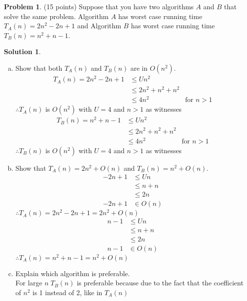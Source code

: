 \documentclass{article}
\theoremstyle{definition}
\newtheorem{problem}{Problem}
\newtheorem*{solution}{Solution}
\begin{document}
\begin{problem} (15 points)
Suppose that you have two algorithms $A$ and $B$ that solve the same
problem. Algorithm $A$ has worst case running time $T_A(n) = 2n^2-2n+1$ 
and Algorithm $B$ has worst case running time $T_B(n) = n^2+n-1$.
\end{problem}
\begin{solution}\ \\
\begin{enumerate}[a)]
\item Show that both $T_A(n)$ and $T_B(n)$ are in $O(n^2)$.
\begin{align*}
  T_A(n) = 2n^2 - 2n + 1 &\le U n^2 \\
  &\le 2n^2 + n^2 + n^2 \\
  &\le 4 n^2 &\text{for $n > 1$}
\end{align*}
$\therefore T_A(n)$ is $O(n^2)$ with $U = 4$ and $n>1$ as witnesses \\

\begin{align*}
  T_B(n) = n^2+n-1 &\le U n^2 \\
  &\le 2n^2 + n^2 + n^2 \\
  &\le 4 n^2 &\text{for $n > 1$}
\end{align*}
$\therefore T_B(n)$ is $O(n^2)$ with $U = 4$ and $n>1$ as witnesses

\item Show that $T_A(n) = 2n^2 + O(n)$ and $T_B(n) = n^2 +O(n)$.
\begin{align*}
  -2n+1 &\le Un \\
  &\le n + n \\
  &\le 2n \\
  -2n+1 &\in O(n)
\end{align*}
$\therefore T_A(n) = 2n^2-2n+1=2n^2 + O(n)$
\begin{align*}
  n-1 &\le Un \\
  &\le n + n \\
  &\le 2n \\
  n-1 &\in O(n)
\end{align*}
$\therefore T_A(n) = n^2+n-1=n^2 + O(n)$

\item Explain which algorithm is preferable. \\
For large $n \; T_B(n)$ is preferable because due to the fact that the coefficient of $n^2$ is 1 instead of 2, like in $T_A(n)$
\end{enumerate}
\end{solution}
\end{document}
